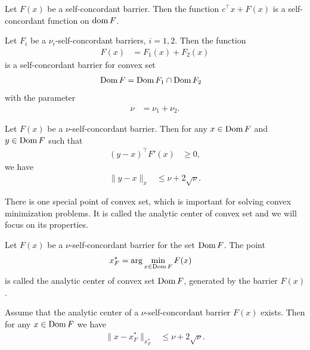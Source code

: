 \begin{theorem}
  Let $F(x)$ be a self-concordant barrier. Then the function $c^\top x + F(x)$ is a self-concordant function on $\operatorname{dom} F$.
\end{theorem}

\begin{theorem}
  Let $F_i$ be a $\nu_i$-self-concordant barriers, $i = 1,2$. Then the function
  \begin{align}
    F(x) &= F_1(x) + F_2(x)
  \end{align}
  is a self-concordant barrier for convex set
  \begin{align}
    \operatorname{Dom} F &= \operatorname{Dom} F_1 \cap \operatorname{Dom} F_2
  \end{align}
  with the parameter
  \begin{align}
    \nu &= \nu_1 + \nu_2.
  \end{align}
\end{theorem}

\begin{theorem}
  Let $F(x)$ be a $\nu$-self-concordant barrier. Then for any $x\in\operatorname{Dom} F$ and $y\in\operatorname{Dom} F$ such that
  \begin{align}
    (y-x)^\top F'(x) &\geq 0,
  \end{align}
  we have
  \begin{align}
    \|y-x\|_x &\leq \nu + 2\sqrt{\nu}.
  \end{align}
\end{theorem}

There is one special point of convex set, which is important for solving convex minimization problems.
It is called the analytic center of convex set and we will focus on its properties.

\begin{definition}
  Let $F(x)$ be a $\nu$-self-concordant barrier for the set $\operatorname{Dom} F$. The point
  \begin{align}
    x^*_F &= \arg \min_{x\in\Dom F} F(x) \labeleq{SDP:scb:ac}
  \end{align}
  is called the analytic center of convex set $\operatorname{Dom} F$, generated by the barrier $F(x)$.
\end{definition}

\begin{theorem}
  Assume that the analytic center of a $\nu$-self-concordant barrier $F(x)$ exists. Then for any $x\in\operatorname{Dom} F$ we have
  \begin{align}
    \|x-x^*_F\|_{x^*_F} &\leq \nu + 2\sqrt{\nu}.
  \end{align}
\end{theorem}

